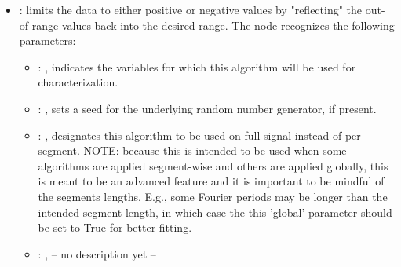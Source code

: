 \begin{itemize}
    \item {}:
      limits the data to either positive or negative values by "reflecting" the
      out-of-range values back into the desired range.
      The  node recognizes the following parameters:
        \begin{itemize}
          \item {}: , 
            indicates the variables for which this algorithm will be used for characterization.
          \item {}: , 
            sets a seed for the underlying random number generator, if present.
          \item {}: , 
            designates this algorithm to be used on full signal instead of per
            segment. NOTE: because this is intended to be used when some algorithms are
            applied segment-wise and others are applied globally, this is meant to be an
            advanced feature and it is important to be mindful of the segments lengths.
            E.g., some Fourier periods may be longer than the intended segment length, in
            which case the this 'global' parameter should be set to True for better
            fitting. 
          \item {}: , 
            -- no description yet --
      \end{itemize}


\end{itemize}

